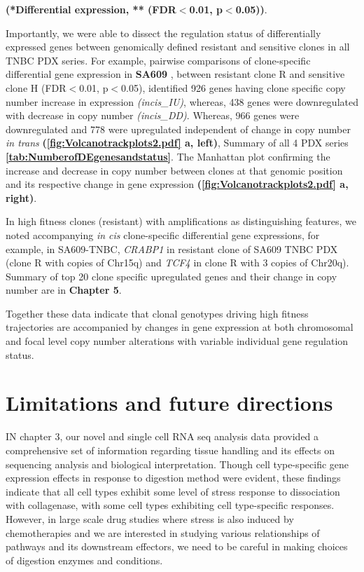 \begin{table}[htbp]
   \label{tab:NumberofDEgenesandstatus}%
   
   \small\textbf{(*Differential expression, ** (FDR$<$0.01, p$<$0.05))}.
 \end{table}%


Importantly, we were able to dissect the regulation status of  differentially expressed genes between genomically defined resistant and sensitive clones in all TNBC PDX series. For example, pairwise comparisons of clone-specific differential gene expression in \textbf{SA609} , between resistant clone R and sensitive clone H (FDR$<$0.01, p$<$0.05), identified 926 genes having clone specific copy number increase in expression \textit{(incis\_IU)}, whereas, 438 genes were downregulated with decrease in copy number \textit{(incis\_DD)}. Whereas, 966 genes were downregulated and 778 were upregulated  independent of change in copy number \textit{in trans} \textbf{(\autoref{fig:Volcanotrackplots2.pdf} a, left)}, Summary of all 4 PDX series \textbf{\autoref{tab:NumberofDEgenesandstatus}}. The Manhattan plot confirming the increase and decrease in copy number between clones at that genomic position and its respective change in gene expression \textbf{(\autoref{fig:Volcanotrackplots2.pdf} a, right)}.

In high fitness clones (resistant) with amplifications as distinguishing features, we noted accompanying \textit{in cis} clone-specific differential gene expressions, for example, in SA609-TNBC, \textit{CRABP1} in resistant clone of SA609 TNBC PDX (clone R with copies of Chr15q) and  \textit{TCF4} in clone R with 3 copies of Chr20q). Summary of top 20 clone specific upregulated genes and their change in copy number are in \textbf{Chapter 5}.

Together these data indicate that clonal genotypes driving high fitness trajectories are accompanied by changes in gene expression at both chromosomal and focal level copy number alterations with variable individual gene regulation status.


\section{Limitations and future directions}

IN chapter 3, our novel and single cell RNA seq analysis data provided a comprehensive set of information regarding tissue handling and its effects on sequencing analysis and biological interpretation. Though cell type-specific gene expression effects in response to digestion method were evident, these findings indicate that all cell types exhibit some level of stress response to dissociation with collagenase, with some cell types exhibiting cell type-specific responses. 
However, in large scale drug studies where stress is also induced by chemotherapies and we are interested in studying various relationships of pathways and its downstream effectors, we need to be careful in making choices of digestion enzymes and conditions. 

